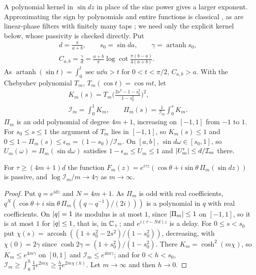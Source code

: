 A polynomial kernel in $\sin dz$ in place of the sinc power gives a larger
exponent. Approximating the sign by polynomials and entire functions is
classical \cite{eremenkoyuditskii}, as are linear-phase filters with finitely
many taps \cite{parksmcclellan}; we need only the explicit kernel below, whose
passivity is checked directly. Put
\begin{gather*}
d=\frac\pi{a+b},\qquad s_0=\sin da,\qquad \gamma=\operatorname{artanh}s_0,\\
C_{a,b}=\frac\gamma d=\frac{a+b}\pi\log\cot\frac{\pi(b-a)}{4(a+b)} .
\end{gather*}
As $\operatorname{artanh}(\sin t)=\int_0^t\sec u\dd u>t$ for $0<t<\pi/2$,
$C_{a,b}>a$. With the Chebyshev polynomial $T_m$, $T_m(\cos t)=\cos mt$, let
\begin{gather*}
K_m(s)=T_m\Big(\frac{2s^2-1-s_0^2}{1-s_0^2}\Big)^2,\\
\mathcal I_m=\int_0^1K_m,\qquad \Pi_m(s)=\frac1{\mathcal I_m}\int_0^sK_m .
\end{gather*}
$\Pi_m$ is an odd polynomial of degree $4m+1$, increasing on $[-1,1]$ from $-1$
to $1$. For $s_0\le s\le1$ the argument of $T_m$ lies in $[-1,1]$, so
$K_m(s)\le1$ and $0\le1-\Pi_m(s)\le\epsilon_m=(1-s_0)/\mathcal I_m$. On $[a,b]$,
$\sin d\omega\in[s_0,1]$, so $U_m(\omega)=\Pi_m(\sin d\omega)$ satisfies
$1-\epsilon_m\le U_m\le1$ and $\left|U_m'\right|\le d/\mathcal I_m$ there.

\begin{lemma}\label{lem:chebnorm}
For $\tau\ge(4m+1)d$ the function
$F_m(z)=e^{i\tau z}(\cos\theta+i\sin\theta\,\Pi_m(\sin dz))$ is passive, and
$\log\mathcal I_m/m\to4\gamma$ as $m\to\infty$.
\end{lemma}

\begin{proof}
Put $q=e^{idz}$ and $N=4m+1$. As $\Pi_m$ is odd with real coefficients,
$q^N(\cos\theta+i\sin\theta\,\Pi_m((q-q^{-1})/(2i)))$ is a polynomial in $q$
with real coefficients. On $\left|q\right|=1$ its modulus is at most $1$, since
$\left|\Pi_m\right|\le1$ on $[-1,1]$, so it is at most $1$ for $\left|q\right|\le1$, that is,
in $\mathbb C_{+}$; and $e^{i(\tau-Nd)z}$ is a delay. For $0\le s<s_0$ put
$\chi(s)=\operatorname{arcosh}((1+s_0^2-2s^2)/(1-s_0^2))$, decreasing, with
$\chi(0)=2\gamma$ since $\cosh2\gamma=(1+s_0^2)/(1-s_0^2)$. There
$K_m=\cosh^2(m\chi)$, so $K_m\le e^{4m\gamma}$ on $[0,1]$ and
$\mathcal I_m\le e^{4m\gamma}$; and for $0<h<s_0$,
$\mathcal I_m\ge\int_0^h\frac14e^{2m\chi}\ge\frac h4e^{2m\chi(h)}$. Let
$m\to\infty$ and then $h\to0$.
\end{proof}

